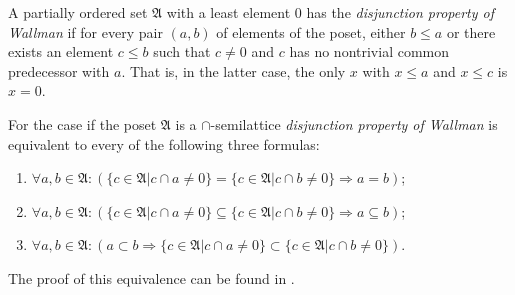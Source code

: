 \documentclass[12pt]{article}
\begin{document}
A partially ordered set $\mathfrak{A}$ with a least element $0$ has the \emph{disjunction property of Wallman} if for every pair $(a,b)$ of elements of the poset, either $b\leq a$ or there exists an element $c\leq b$ such that $c\ne 0$ and $c$ has no nontrivial common predecessor with $a$. That is, in the latter case, the only $x$ with $x\leq a$ and $x\leq c$ is $x=0$.

For the case if the poset $\mathfrak{A}$ is a $\cap$-semilattice \emph{disjunction property of Wallman} is equivalent to every of the following three formulas:

\begin{enumerate}
\item
$\forall a,b\in\mathfrak{A}:(\{c\in\mathfrak{A}|c\cap a\ne 0\} = \{c\in\mathfrak{A}|c\cap b\ne 0\} \Rightarrow a = b)$;
\item
$\forall a,b\in\mathfrak{A}:(\{c\in\mathfrak{A}|c\cap a\ne 0\} \subseteq \{c\in\mathfrak{A}|c\cap b\ne 0\} \Rightarrow
  a \subseteq b)$;
\item
$\forall a,b\in\mathfrak{A}:(a\subset b \Rightarrow
\{c\in\mathfrak{A}|c\cap a\ne 0\} \subset \{c\in\mathfrak{A}|c\cap b\ne 0\})$.
\end{enumerate}

The proof of this equivalence can be found in .
\end{document}
